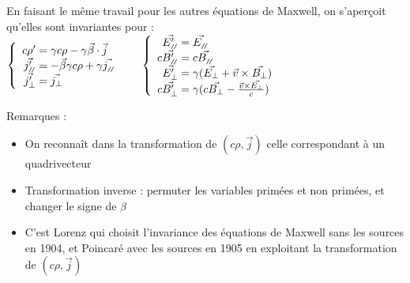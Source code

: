En faisant le même travail pour les autres équations de Maxwell, on s'aperçoit qu'elles sont invariantes pour :\\
\indent$
\left\{ \begin{array}{r@{\;}l}
	c\rho '&=\gamma c\rho-\gamma\vec{\beta}\cdot\vec{j}\\
	\vec{j'_{\para}}&=-\vec{\beta}\gamma c\rho+\gamma\vec{j_{\para}}\\
	\vec{j'_{\perp}}&=\vec{j_{\perp}}
\end{array} \right.\\[10pt]\indent
\left\{ \begin{array}{r@{\;}l}
	\vec{E'_{\para}}&=\vec{E_{\para}}\\
	c\vec{B'_{\para}}&=c\vec{B_{\para}}\\
	\vec{E'_{\perp}}&=\gamma(\vec{E_{\perp}}+\vec{v}\times\vec{B_{\perp}})\\
	c\vec{B'_{\perp}}&=\gamma(c\vec{B_{\perp}}-\frac{\vec{v}\times\vec{E_{\perp}}}{c})
\end{array} \right.\\
$


Remarques : 
\begin{itemize}
	\item On reconna\^it dans la transformation de $(c\rho,\vec{j})$ celle correspondant à un quadrivecteur
	\item Transformation inverse : permuter les variables primées et non primées, et changer le signe de $\beta$
	\item C'est Lorenz qui choisit l'invariance des équations de Maxwell sans les sources en 1904, et Poincaré avec les sources en 1905 en exploitant la transformation de $(c\rho,\vec{j})$
\end{itemize}

